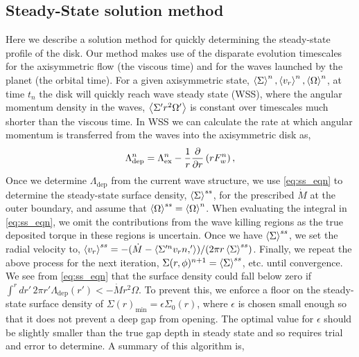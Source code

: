 


\subsection{Steady-State solution method} \label{sec:methods_ss}

Here we describe a solution method for quickly determining the steady-state profile of the disk. Our method makes use of the disparate evolution timescales for the axisymmetric flow (the viscous time) and for the waves launched by the planet (the orbital time). For a given axisymmetric state, $\left\langle \Sigma \right\rangle^n, \left\langle v_r \right\rangle^n, \left\langle \Omega \right\rangle^n$, at time $t_n$ the disk will quickly reach wave steady state (WSS), where the angular momentum density in the waves, $\left\langle \Sigma' r^2 \Omega' \right\rangle$ is constant over timescales much shorter than the viscous time. In WSS we can calculate the rate at which angular momentum is transferred from the waves into the axisymmetric disk as,
\begin{equation}
    \Lambda_\text{dep}^n = \Lambda_\text{ex}^n - \frac{1}{r} \pderiv{r} \left( r F_w^n \right), 
\end{equation}
Once we determine $\Lambda_\text{dep}$ from the current wave structure, we use \eqref{eq:ss_eqn} to determine the steady-state surface density, $\left\langle \Sigma \right\rangle^{ss}$, for the prescribed $\dot{M}$ at the outer boundary, and assume that $\left\langle \Omega \right\rangle^{ss} = \left\langle \Omega \right\rangle^n$. When evaluating the integral in \eqref{eq:ss_eqn}, we omit the contributions from the wave killing regions as the true deposited torque in these regions is uncertain. Once we have $\left\langle \Sigma \right\rangle^{ss}$, we set the radial velocity to, $\left\langle v_r \right\rangle^{ss} = -(\dot{M} - \left\langle \Sigma'^n v_r{n,'} \right\rangle)/(2 \pi r \left\langle \Sigma \right\rangle^{ss})$. Finally, we repeat the above process for the next iteration, $\Sigma(r,\phi)^{n+1} = \left\langle \Sigma \right\rangle^{ss}$, etc. until convergence. We see from \eqref{eq:ss_eqn} that the surface density could fall below zero if $\int^r dr' \, 2\pi r' \Lambda_\text{dep}(r')  < - \dot{M} r^2 \Omega$. To prevent this, we enforce a floor on the steady-state surface density of $\Sigma(r)_\text{min} = \epsilon \Sigma_0(r)$, where $\epsilon$ is chosen small enough so that it does not prevent a deep gap from opening. The optimal value for $\epsilon$ should be slightly smaller than the true gap depth in steady state and so requires trial and error to determine.  A summary of this algorithm is,

